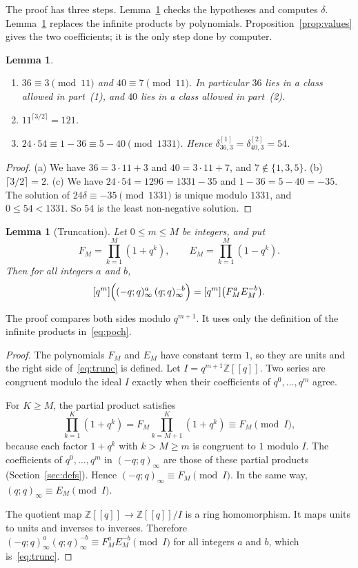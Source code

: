 \documentclass[11pt]{amsart}
\newtheorem{lemma}[theorem]{Lemma}
\theoremstyle{definition}
\theoremstyle{remark}
\newcommand{\Z}{\mathbb{Z}}
\newcommand{\poch}[2]{(#1;#2)_{\infty}}
\newcommand{\done}[2]{\delta^{[1]}_{#1,#2}}
\newcommand{\dtwo}[2]{\delta^{[2]}_{#1,#2}}
\newcommand{\cf}[1]{[q^{#1}]}
\begin{document}
The proof has three steps. Lemma~\ref{lem:hyp} checks the hypotheses and computes \(\delta\). Lemma~\ref{lem:trunc} replaces the infinite products by polynomials. Proposition~\ref{prop:values} gives the two coefficients; it is the only step done by computer.

\begin{lemma}\label{lem:hyp}
\begin{enumerate}
\item[(a)] \(36\equiv3\pmod{11}\) and \(40\equiv7\pmod{11}\). In particular \(36\) lies in a class allowed in part~(1), and \(40\) lies in a class allowed in part~(2).
\item[(b)] \(11^{\lceil3/2\rceil}=121\).
\item[(c)] \(24\cdot54\equiv1-36\equiv5-40\pmod{1331}\). Hence \(\done{36}{3}=\dtwo{40}{3}=54\).
\end{enumerate}
\end{lemma}

\begin{proof}
(a) We have \(36=3\cdot11+3\) and \(40=3\cdot11+7\), and \(7\notin\{1,3,5\}\). (b) \(\lceil3/2\rceil=2\). (c) We have \(24\cdot54=1296=1331-35\) and \(1-36=5-40=-35\). The solution of \(24\delta\equiv-35\pmod{1331}\) is unique modulo \(1331\), and \(0\le54<1331\). So \(54\) is the least non-negative solution.
\end{proof}

\begin{lemma}[Truncation]\label{lem:trunc}
Let \(0\le m\le M\) be integers, and put
\[
F_M=\prod_{k=1}^{M}(1+q^k),\qquad E_M=\prod_{k=1}^{M}(1-q^k).
\]
Then for all integers \(a\) and \(b\),
\begin{equation}\label{eq:trunc}
\cf{m}\Bigl(\poch{-q}{q}^{a}\,\poch{q}{q}^{-b}\Bigr)=\cf{m}\bigl(F_M^{a}E_M^{-b}\bigr).
\end{equation}
\end{lemma}

The proof compares both sides modulo \(q^{m+1}\). It uses only the definition of the infinite products in~\eqref{eq:poch}.

\begin{proof}
The polynomials \(F_M\) and \(E_M\) have constant term \(1\), so they are units and the right side of~\eqref{eq:trunc} is defined. Let \(I=q^{m+1}\Z[[q]]\). Two series are congruent modulo the ideal \(I\) exactly when their coefficients of \(q^0,\dots,q^m\) agree.

For \(K\ge M\), the partial product satisfies
\[
\prod_{k=1}^{K}(1+q^k)=F_M\prod_{k=M+1}^{K}(1+q^k)\equiv F_M\pmod I,
\]
because each factor \(1+q^k\) with \(k>M\ge m\) is congruent to \(1\) modulo \(I\). The coefficients of \(q^0,\dots,q^m\) in \(\poch{-q}{q}\) are those of these partial products (Section~\ref{sec:defs}). Hence \(\poch{-q}{q}\equiv F_M\pmod I\). In the same way, \(\poch{q}{q}\equiv E_M\pmod I\).

The quotient map \(\Z[[q]]\to\Z[[q]]/I\) is a ring homomorphism. It maps units to units and inverses to inverses. Therefore \(\poch{-q}{q}^{a}\poch{q}{q}^{-b}\equiv F_M^{a}E_M^{-b}\pmod I\) for all integers \(a\) and \(b\), which is~\eqref{eq:trunc}.
\end{proof}
\end{document}
